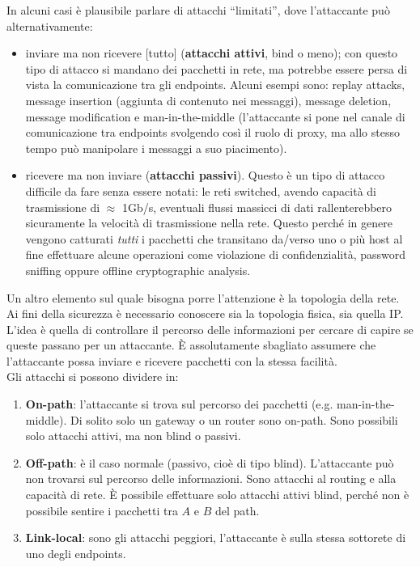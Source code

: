 In alcuni casi è plausibile parlare di attacchi “limitati”, dove l'attaccante può alternativamente:
\begin{itemize}
	\item inviare ma non ricevere [tutto] (\textbf{attacchi attivi}, bind o meno); con questo tipo di attacco si mandano dei pacchetti in rete, ma potrebbe essere persa di vista la comunicazione tra gli endpoints. Alcuni esempi sono: replay attacks, message insertion (aggiunta di contenuto nei messaggi), message deletion, message modification e man-in-the-middle (l'attaccante si pone nel canale di comunicazione tra endpoints svolgendo così il ruolo di proxy, ma allo stesso tempo può manipolare i messaggi a suo piacimento).
	\item ricevere ma non inviare (\textbf{attacchi passivi}). Questo è un tipo di attacco difficile da fare senza essere notati: le reti switched, avendo capacità di trasmissione di $\approx$ 1Gb/s, eventuali flussi massicci di dati rallenterebbero sicuramente la velocità di trasmissione nella rete. Questo perché in genere vengono catturati \textit{tutti} i pacchetti che transitano da/verso uno o più host al fine effettuare alcune operazioni come violazione di confidenzialità, password sniffing oppure offline cryptographic analysis.
\end{itemize}
Un altro elemento sul quale bisogna porre l'attenzione è la topologia della rete. Ai fini della sicurezza è necessario conoscere sia la topologia fisica, sia quella IP. L'idea è quella di controllare il percorso delle informazioni per cercare di capire se queste passano per un attaccante. È assolutamente sbagliato assumere che l'attaccante possa inviare e ricevere pacchetti con la stessa facilità.\\
Gli attacchi si possono dividere in:
\begin{enumerate}
	\item \textbf{On-path}: l'attaccante si trova sul percorso dei pacchetti (e.g. man-in-the-middle). Di solito solo un gateway o un router sono on-path. Sono possibili solo attacchi attivi, ma non blind o passivi.
	\item \textbf{Off-path}: è il caso normale (passivo, cioè di tipo blind). L'attaccante può non trovarsi sul percorso delle informazioni. Sono attacchi al routing e alla capacità di rete. È possibile effettuare solo attacchi attivi blind, perché non è possibile sentire i pacchetti tra $A$ e $B$ del path.
	\item \textbf{Link-local}: sono gli attacchi peggiori, l'attaccante è sulla stessa sottorete di uno degli endpoints.
\end{enumerate}
